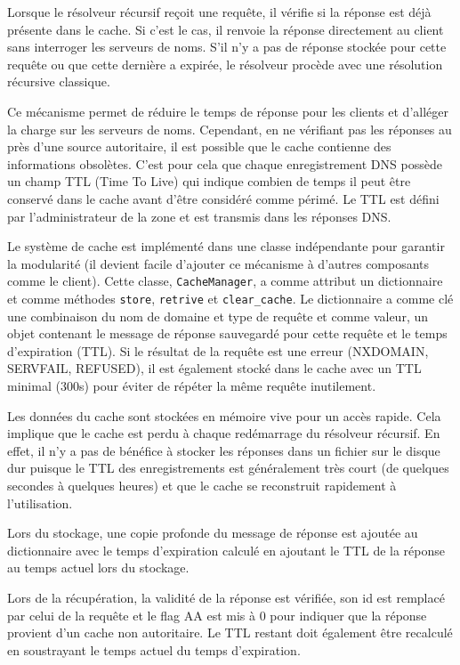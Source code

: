 Lorsque le résolveur récursif reçoit une requête, il vérifie si la réponse est déjà présente dans le cache.
Si c'est le cas, il renvoie la réponse directement au client sans interroger les serveurs de noms.
S'il n'y a pas de réponse stockée pour cette requête ou que cette dernière a expirée, le résolveur procède avec une résolution récursive classique.

Ce mécanisme permet de réduire le temps de réponse pour les clients et d'alléger la charge sur les serveurs de noms.
Cependant, en ne vérifiant pas les réponses au près d'une source autoritaire, il est possible que le cache contienne des informations obsolètes.
C'est pour cela que chaque enregistrement DNS possède un champ TTL (Time To Live) qui indique combien de temps il peut être conservé dans le cache avant d'être considéré comme périmé.
Le TTL est défini par l'administrateur de la zone et est transmis dans les réponses DNS.

Le système de cache est implémenté dans une classe indépendante pour garantir la modularité (il devient facile d'ajouter ce mécanisme à d'autres composants comme le client).
Cette classe, \texttt{CacheManager}, a comme attribut un dictionnaire et comme méthodes \texttt{store}, \texttt{retrive} et \texttt{clear\_cache}.
Le dictionnaire a comme clé une combinaison du nom de domaine et type de requête et comme valeur, un objet contenant le message de réponse sauvegardé pour cette requête et le temps d'expiration (TTL).
Si le résultat de la requête est une erreur (NXDOMAIN, SERVFAIL, REFUSED), il est également stocké dans le cache avec un TTL minimal (300s) pour éviter de répéter la même requête inutilement.

Les données du cache sont stockées en mémoire vive pour un accès rapide.
Cela implique que le cache est perdu à chaque redémarrage du résolveur récursif.
En effet, il n'y a pas de bénéfice à stocker les réponses dans un fichier sur le disque dur puisque le TTL des enregistrements est généralement très court (de quelques secondes à quelques heures) et que le cache se reconstruit rapidement à l'utilisation.

Lors du stockage, une copie profonde du message de réponse est ajoutée au dictionnaire avec le temps d'expiration calculé en ajoutant le TTL de la réponse au temps actuel lors du stockage.

Lors de la récupération, la validité de la réponse est vérifiée, son id est remplacé par celui de la requête et le flag AA est mis à 0 pour indiquer que la réponse provient d'un cache non autoritaire.
Le TTL restant doit également être recalculé en soustrayant le temps actuel du temps d'expiration.

